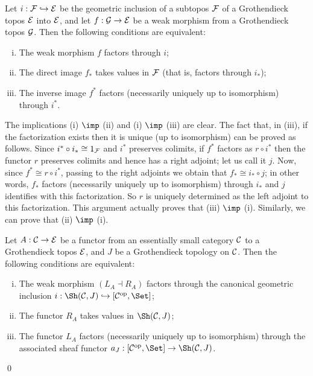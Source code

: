 \documentclass[a4paper,12pt]{article}
\begin{document}
\begin{proposition}
	Let $i:{\cal F}\hookrightarrow {\cal E}$ be the geometric inclusion of a subtopos $\cal F$ of a Grothendieck topos $\cal E$ into $\cal E$, and let $f:{\cal G}\to {\cal E}$ be a weak morphism from a Grothendieck topos $\cal G$. Then the following conditions are equivalent:
	\begin{enumerate}[(i)]
		\item The weak morphism $f$ factors through $i$; 
		
		\item The direct image $f_{\ast}$ takes values in $\cal F$ (that is, factors through $i_{\ast}$);
		
		\item The inverse image $f^{\ast}$ factors (necessarily uniquely up to isomorphism) through $i^{\ast}$.
	\end{enumerate} 
\end{proposition}

\begin{proofs}
	The implications (i) $\imp$ (ii) and (i) $\imp$ (iii) are clear. The fact that, in (iii), if the factorization exists then it is unique (up to isomorphism) can be proved as follows. Since $i^{\ast}\circ i_{\ast}\cong 1_{\cal F}$ and $i^{\ast}$ preserves colimits, if $f^{\ast}$ factors as $r\circ i^{\ast}$ then the functor $r$ preserves colimits and hence has a right adjoint; let us call it $j$. Now, since $f^{\ast}\cong r\circ i^{\ast}$, passing to the right adjoints we obtain that $f_{\ast}\cong i_{\ast}\circ j$; in other words, $f_{\ast}$ factors (necessarily uniquely up to isomorphism) through $i_{\ast}$ and $j$ identifies with this factorization. So $r$ is uniquely determined as the left adjoint to this factorization. This argument actually proves that (iii) $\imp$ (i). Similarly, we can prove that (ii) $\imp$ (i).   
\end{proofs}

\begin{corollary}\label{corfact}
	Let $A:{\cal C}\to {\cal E}$ be a functor from an essentially small category $\cal C$ to a Grothendieck topos $\cal E$, and $J$ be a Grothendieck topology on $\cal C$. Then the following conditions are equivalent:
	\begin{enumerate}[(i)]
		\item The weak morphism $(L_{A} \dashv R_{A})$ factors through the canonical geometric inclusion $i:\Sh({\cal C}, J)\hookrightarrow [{\cal C}^{\textup{op}}, \Set]$; 
		
		\item The functor $R_{A}$ takes values in $\Sh({\cal C}, J)$;
		
		\item The functor $L_{A}$ factors (necessarily uniquely up to isomorphism) through the associated sheaf functor $a_{J}:[{\cal C}^{\textup{op}}, \Set]\to \Sh({\cal C}, J)$.
	\end{enumerate} 
\end{corollary}\qed
\end{document}
